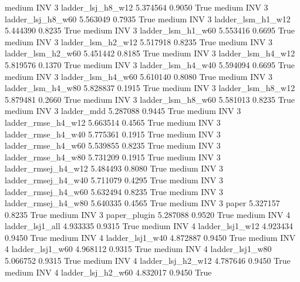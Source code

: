     medium      INV                 3   ladder_lsj_h8_w12   5.374564      0.9050    True
    medium      INV                 3   ladder_lsj_h8_w60   5.563049      0.7935    True
    medium      INV                 3   ladder_lsm_h1_w12   5.444390      0.8235    True
    medium      INV                 3   ladder_lsm_h1_w60   5.553416      0.6695    True
    medium      INV                 3   ladder_lsm_h2_w12   5.517918      0.8235    True
    medium      INV                 3   ladder_lsm_h2_w60   5.451442      0.8185    True
    medium      INV                 3   ladder_lsm_h4_w12   5.819576      0.1370    True
    medium      INV                 3   ladder_lsm_h4_w40   5.594094      0.6695    True
    medium      INV                 3   ladder_lsm_h4_w60   5.610140      0.8080    True
    medium      INV                 3   ladder_lsm_h4_w80   5.828837      0.1915    True
    medium      INV                 3   ladder_lsm_h8_w12   5.879481      0.2660    True
    medium      INV                 3   ladder_lsm_h8_w60   5.581013      0.8235    True
    medium      INV                 3          ladder_mdd   5.287088      0.9445    True
    medium      INV                 3  ladder_rmse_h4_w12   5.663514      0.4565    True
    medium      INV                 3  ladder_rmse_h4_w40   5.775361      0.1915    True
    medium      INV                 3  ladder_rmse_h4_w60   5.539855      0.8235    True
    medium      INV                 3  ladder_rmse_h4_w80   5.731209      0.1915    True
    medium      INV                 3 ladder_rmsej_h4_w12   5.484493      0.8080    True
    medium      INV                 3 ladder_rmsej_h4_w40   5.711079      0.4295    True
    medium      INV                 3 ladder_rmsej_h4_w60   5.632494      0.8235    True
    medium      INV                 3 ladder_rmsej_h4_w80   5.640335      0.4565    True
    medium      INV                 3               paper   5.327157      0.8235    True
    medium      INV                 3        paper_plugin   5.287088      0.9520    True
    medium      INV                 4     ladder_lsj1_all   4.933335      0.9315    True
    medium      INV                 4     ladder_lsj1_w12   4.923434      0.9450    True
    medium      INV                 4     ladder_lsj1_w40   4.872887      0.9450    True
    medium      INV                 4     ladder_lsj1_w60   4.968112      0.9315    True
    medium      INV                 4     ladder_lsj1_w80   5.066752      0.9315    True
    medium      INV                 4   ladder_lsj_h2_w12   4.787646      0.9450    True
    medium      INV                 4   ladder_lsj_h2_w60   4.832017      0.9450    True
